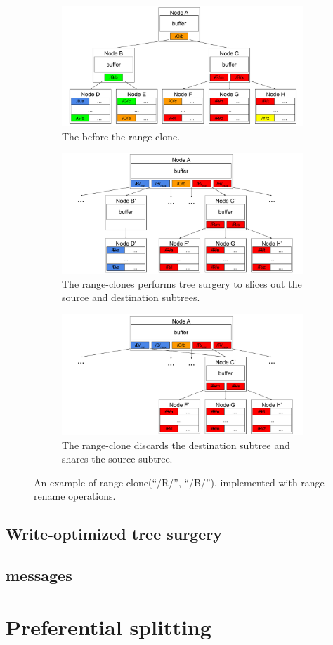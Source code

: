 \begin{figure}
    \begin{subfigure}{\textwidth}
        \centering
        \includegraphics[width=.7\linewidth]{fig/rr-1}
        \caption{\label{subfig:rc1-1} The \bet before the range-clone.}
    \end{subfigure}
    \begin{subfigure}{\textwidth}
        \centering
        \includegraphics[width=.7\linewidth]{fig/rr-2}
        \caption{\label{subfig:rc1-2} The range-clones performs tree surgery
            to slices out the source and destination subtrees.}
    \end{subfigure}
    \begin{subfigure}{\textwidth}
        \centering
        \includegraphics[width=.7\linewidth]{fig/rc1-3}
        \caption{\label{subfig:rc1-3} The range-clone discards the destination
            subtree and shares the source subtree.}
    \end{subfigure}
    \caption[A range-clone example using range-rename code]{\label{fig:rc1}
        An example of range-clone(``/R/'', ``/B/''), implemented with
        range-rename operations.}
\end{figure}

\subsection{Write-optimized tree surgery}

\subsection{\goto messages}

\section{Preferential splitting}
